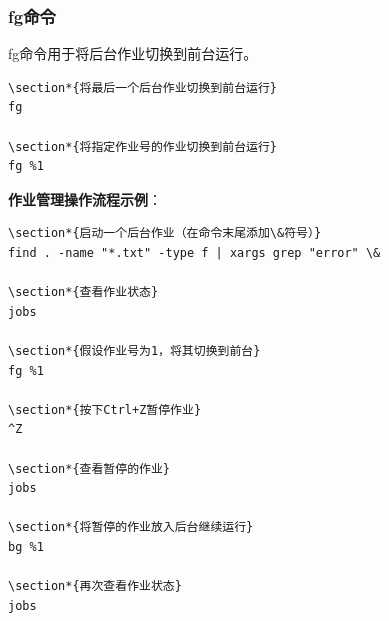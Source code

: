 \documentclass[12pt,UTF8]{ctexbook}
\begin{document}
\subsubsection{fg命令}
fg命令用于将后台作业切换到前台运行。

\begin{verbatim}
\section*{将最后一个后台作业切换到前台运行}
fg

\section*{将指定作业号的作业切换到前台运行}
fg %1
\end{verbatim}

\textbf{作业管理操作流程示例}：
\begin{verbatim}
\section*{启动一个后台作业（在命令末尾添加\&符号）}
find . -name "*.txt" -type f | xargs grep "error" \&

\section*{查看作业状态}
jobs

\section*{假设作业号为1，将其切换到前台}
fg %1

\section*{按下Ctrl+Z暂停作业}
^Z

\section*{查看暂停的作业}
jobs

\section*{将暂停的作业放入后台继续运行}
bg %1

\section*{再次查看作业状态}
jobs
\end{verbatim}
\end{document}
